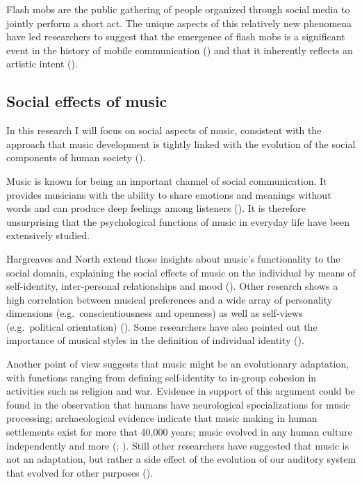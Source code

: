 \documentclass[a4paper,11pt]{article}
\begin{document}
Flash mobs are the public gathering of people organized through social media to jointly perform a short act.
The unique aspects of this relatively new phenomena have led researchers to suggest that the emergence of flash mobs is a significant event in the history of mobile communication (\cite{nicholson05}) and that it inherently reflects an artistic intent (\cite{brejzek10}).

\subsection{Social effects of music}


In this research I will focus on social aspects of music, consistent with the approach that music development is tightly linked with the evolution of the social components of human society (\cite{cross2001music}).

Music is known for being an important channel of social communication.
It provides musicians with the ability to share emotions and meanings without words and can produce deep feelings among listeners (\cite{hargreaves02}).
It is therefore unsurprising that the psychological functions of music in everyday life have been extensively studied.

Hargreaves and North extend those insights about music's functionality to the social domain, explaining the social effects of music on the individual by means of self-identity, inter-personal relationships and mood (\cite*{hargreaves99}).
Other research shows a high correlation between musical preferences and a wide array of personality dimensions (e.g.\ conscientiousness and openness) as well as self-views (e.g.\ political orientation) (\cite{rentfrow03}).
Some researchers have also pointed out the importance of musical styles in the definition of individual identity (\cite{cook00}).

Another point of view suggests that music might be an evolutionary adaptation, with functions ranging from defining self-identity to in-group cohesion in activities such as religion and war.
Evidence in support of this argument could be found in the observation that humans have neurological specializations for music processing; archaeological evidence indicate that music making in human settlements exist for more that 40,000 years; music evolved in any human culture independently and more (\cite{Huron2001}; \cite{mcdermott2005origins}).
Still other researchers have suggested that music is not an adaptation, but rather a side effect of the evolution of our auditory system that evolved for other purposes (\cite{pinker97}).
\end{document}
